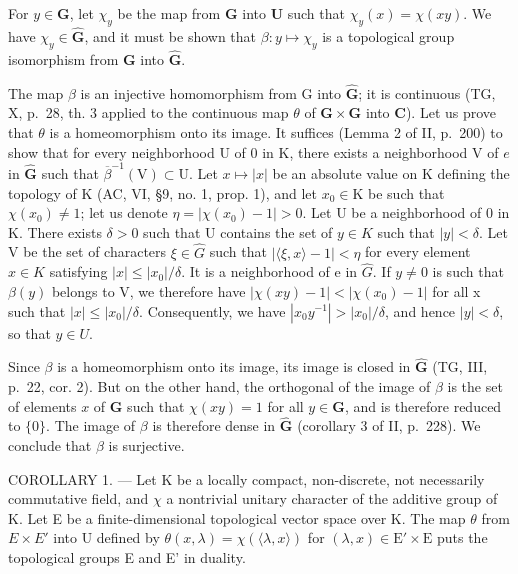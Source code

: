 For \(y \in \mathbf{G}\), let \(\chi_y\) be the map from \(\mathbf{G}\) into \(\mathbf{U}\) such that \(\chi_y(x) = \chi(xy)\). We have \(\chi_y \in \widehat{\mathbf{G}}\), and it must be shown that \(\beta: y \mapsto \chi_y\) is a topological group isomorphism from \(\mathbf{G}\) into \(\widehat{\mathbf{G}}\).

The map \(\beta\) is an injective homomorphism from G into \(\widehat{\mathbf{G}}\); it is continuous (TG, X, p.~28, th. 3 applied to the continuous map \(\theta\) of \(\mathbf{G} \times \mathbf{G}\) into \(\mathbf{C}\)). Let us prove that \(\theta\) is a homeomorphism onto its image. It suffices (Lemma 2 of II, p.~200) to show that for every neighborhood U of 0 in K, there exists a neighborhood V of \(e\) in \(\widehat{\mathbf{G}}\) such that \(\overline{\beta}^{-1}(\mathrm{V}) \subset \mathrm{U}\). Let \(x \mapsto |x|\) be an absolute value on K defining the topology of K (AC, VI, §9, no. 1, prop. 1), and let \(x_0 \in \mathrm{K}\) be such that \(\chi(x_{0}) \neq 1\); let us denote \(\eta = |\chi(x_{0}) - 1| > 0\). Let U be a neighborhood of 0 in K. There exists \(\delta > 0\) such that U contains the set of \(y \in K\) such that \(|y| < \delta\). Let V be the set of characters \(\xi \in \widehat{G}\) such that \(|\langle\xi, x\rangle - 1| < \eta\) for every element \(x \in K\) satisfying \(|x| \leqslant |x_{0}|/\delta\). It is a neighborhood of e in \(\widehat{G}\). If \(y \neq 0\) is such that \(\beta(y)\) belongs to V, we therefore have \(|\chi(xy) - 1| < |\chi(x_{0}) - 1|\) for all x such that \(|x| \leqslant |x_{0}|/\delta\). Consequently, we have \(|x_{0}y^{-1}| > |x_{0}|/\delta\), and hence \(|y| < \delta\), so that \(y \in U\).

Since \(\beta\) is a homeomorphism onto its image, its image is closed in \(\widehat{\mathbf{G}}\) (TG, III, p.~22, cor. 2). But on the other hand, the orthogonal of the image of \(\beta\) is the set of elements \(x\) of \(\mathbf{G}\) such that \(\chi(xy) = 1\) for all \(y \in \mathbf{G}\), and is therefore reduced to \(\{0\}\). The image of \(\beta\) is therefore dense in \(\widehat{\mathbf{G}}\) (corollary 3 of II, p.~228). We conclude that \(\beta\) is surjective.

COROLLARY 1. --- Let K be a locally compact, non-discrete, not necessarily commutative field, and \(\chi\) a nontrivial unitary character of the additive group of K. Let E be a finite-dimensional topological vector space over K. The map \(\theta\) from \(E \times E'\) into U defined by \(\theta(x,\lambda)=\chi(\langle\lambda,x\rangle)\) for \((\lambda,x)\in\mathrm{E}'\times\mathrm{E}\) puts the topological groups E and E' in duality.

